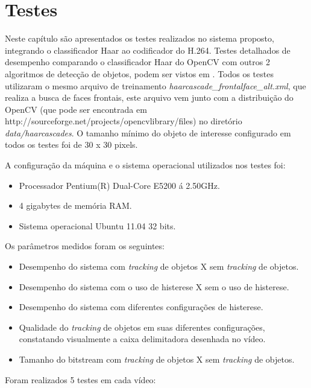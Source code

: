 \chapter{ Testes }

Neste capítulo são apresentados os testes realizados no sistema proposto, integrando o classificador Haar ao codificador do H.264. Testes detalhados de desempenho comparando o classificador Haar do OpenCV com outros 2 algoritmos de detecção de objetos, podem ser vistos em \cite{haarTests}. Todos os testes utilizaram o mesmo arquivo de treinamento \textit{haarcascade\_frontalface\_alt.xml}, que realiza a busca de faces frontais, este arquivo vem junto com a distribuição do OpenCV (que pode ser encontrada em http://sourceforge.net/projects/opencvlibrary/files) no diretório \textit{data/haarcascades}. O tamanho mínimo do objeto de interesse configurado em todos os testes foi de 30 x 30 pixels.

A configuração da máquina e o sistema operacional utilizados nos testes foi:


\begin{itemize}
        \item Processador Pentium(R) Dual-Core E5200 á 2.50GHz.
        \item 4 gigabytes de memória RAM.
        \item Sistema operacional Ubuntu 11.04 32 bits.
\end{itemize}


Os parâmetros medidos foram os seguintes:

\begin{itemize}
        \item Desempenho do sistema com \textit{tracking} de objetos X sem \textit{tracking} de objetos.
	\item Desempenho do sistema com o uso de histerese X sem o uso de histerese.
        \item Desempenho do sistema com diferentes configurações de histerese.
	\item Qualidade do \textit{tracking} de objetos em suas diferentes configurações, constatando visualmente a caixa delimitadora desenhada no vídeo.
	\item Tamanho do bitstream com \textit{tracking} de objetos X sem \textit{tracking} de objetos.
\end{itemize}


Foram realizados 5 testes em cada vídeo:


